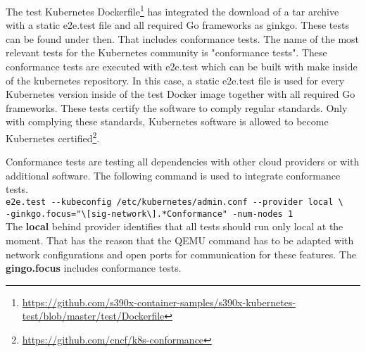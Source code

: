 The test Kubernetes Dockerfile\footnote{\url{https://github.com/s390x-container-samples/s390x-kubernetes-test/blob/master/test/Dockerfile}} has integrated the download of a tar archive with a static e2e.test file and all required Go frameworks as ginkgo.
These tests can be found under  then. That includes conformance tests.
The name of the most relevant tests for the Kubernetes community is "conformance tests". These conformance tests are executed with e2e.test  which can be built with make inside of the kubernetes repository. 
In this case, a static e2e.test file is used for every Kubernetes version inside of the test Docker image together with all required Go frameworks. These tests certify the software to comply regular standards. Only with complying these standards, Kubernetes software is allowed to become Kubernetes certified\footnote{\url{https://github.com/cncf/k8s-conformance}}. 

Conformance tests are testing all dependencies with other cloud providers or with additional software. The following command is used to integrate conformance tests. \\
\verb+e2e.test --kubeconfig /etc/kubernetes/admin.conf --provider local \+ \\
\verb+-ginkgo.focus="\[sig-network\].*Conformance" -num-nodes 1+  \\
The \textbf{local} behind provider identifies that all tests should run only local at the moment. That has the reason that the \gls{QEMU} command has to be adapted with network configurations and open ports for communication for these features.
The \textbf{gingo.focus} includes conformance tests.


